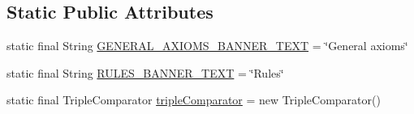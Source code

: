 \subsection*{Static Public Attributes}
\begin{DoxyCompactItemize}
\item 
static final String \hyperlink{classorg_1_1coode_1_1owlapi_1_1rdf_1_1renderer_1_1_r_d_f_renderer_base_a52c5bf78235b89214210cc0ab13fd127}{G\-E\-N\-E\-R\-A\-L\-\_\-\-A\-X\-I\-O\-M\-S\-\_\-\-B\-A\-N\-N\-E\-R\-\_\-\-T\-E\-X\-T} = \char`\"{}General axioms\char`\"{}
\item 
static final String \hyperlink{classorg_1_1coode_1_1owlapi_1_1rdf_1_1renderer_1_1_r_d_f_renderer_base_a7e2e8e76d33a185206483c7a039b7a22}{R\-U\-L\-E\-S\-\_\-\-B\-A\-N\-N\-E\-R\-\_\-\-T\-E\-X\-T} = \char`\"{}Rules\char`\"{}
\item 
static final Triple\-Comparator \hyperlink{classorg_1_1coode_1_1owlapi_1_1rdf_1_1renderer_1_1_r_d_f_renderer_base_aad054f916ec29ad62eaf4b921555d38e}{triple\-Comparator} = new Triple\-Comparator()
\end{DoxyCompactItemize}
